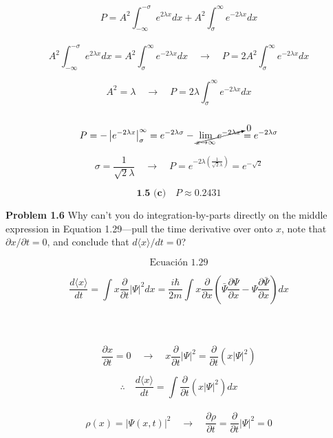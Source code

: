 \documentclass[10pt,a4papper]{article}
\begin{document}
\[P=A^2\int_{-\infty}^{-\sigma}e^{2\lambda x}dx+A^2\int_{\sigma}^\infty e^{-2\lambda x}dx\]\\

\[A^2\int_{-\infty}^{-\sigma}e^{2\lambda x}dx=A^2\int_{\sigma}^\infty e^{-2\lambda x}dx\quad\to\quad
P=2A^2\int_{\sigma}^\infty e^{-2\lambda x}dx\]

\[A^2=\lambda\quad\to\quad P=2\lambda\int_{\sigma}^\infty e^{-2\lambda x}dx\]\\

\[P=
-\left|e^{-2\lambda x}\right|_{\sigma}^\infty=
e^{-2\lambda\sigma}-\cancelto{0}{\lim_{x\to\infty}e^{-2\lambda x}}=
e^{-2\lambda\sigma}\]

\[\sigma=\frac{1}{\sqrt{2}\lambda}\quad\to\quad
P=
e^{-2\lambda\left(\frac{1}{\sqrt{2}\lambda}\right)}=
e^{-\sqrt{2}}\]

\[\boxed{\textbf{1.5 (c)}\quad P\approx 0.2431}\]

\newpage
\textbf{Problem 1.6} Why can't you do integration-by-parts directly on the middle
expression in Equation 1.29---pull the time derivative over onto $x$, note that
$\partial x/\partial t=0$, and conclude that $d\langle x\rangle/dt=0$?

\newpage
\[\text{Ecuación 1.29}\]

\[\frac{d\langle x\rangle}{dt}=
\int x\frac{\partial}{\partial t}|\Psi|^2dx=
\frac{i\hbar}{2m}\int x\frac{\partial}{\partial x}\left(\bar\Psi\frac{\partial\Psi}{\partial x}-\Psi\frac{\partial\bar\Psi}{\partial x}\right)dx\]\\

\\\\

\[\frac{\partial x}{\partial t}=0\quad\to\quad
x\frac{\partial}{\partial t}|\Psi|^2=\frac{\partial}{\partial t}\left(x|\Psi|^2\right)\]

\[\therefore\quad\frac{d\langle x\rangle}{dt}=\int\frac{\partial}{\partial t}\left(x|\Psi|^2\right)dx\]\\

\[\rho(x)=|\Psi(x,t)|^2\quad\to\quad
\frac{\partial\rho}{\partial t}=\frac{\partial}{\partial t}|\Psi|^2=0\]\\
\end{document}
